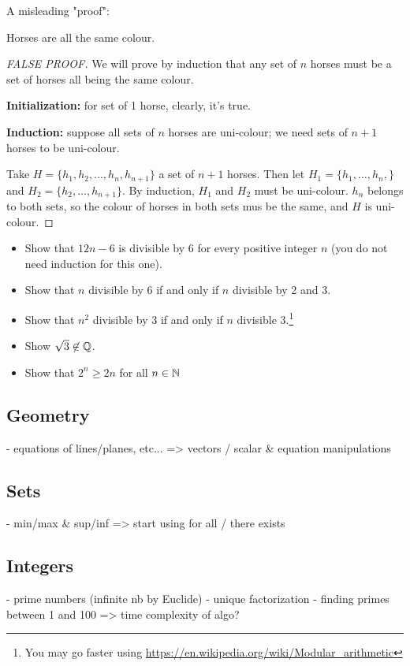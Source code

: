 A misleading "proof":
\begin{property}
    Horses are all the same colour.
\end{property}
\begin{proof}[FALSE PROOF]
    We will prove by induction that any set of $n$ horses must be a set of horses all being the same colour.
    
    \textbf{Initialization:} for set of 1 horse, clearly, it's true.
    
    \textbf{Induction:} suppose all sets of $n$ horses are uni-colour; we need sets of $n+1$ horses to be uni-colour.
    
    Take $H=\{ h_1, h_2, \dots, h_n, h_{n+1} \}$ a set of $n+1$ horses.
    Then let $H_1 = \{ h_1, \dots, h_n, \}$ and $H_2 = \{ h_2, \dots, h_{n+1} \}$.
    By induction, $H_1$ and $H_2$ must be uni-colour.
    $h_n$ belongs to both sets, so the colour of horses in both sets mus be the same, and $H$ is uni-colour.
\end{proof}

\begin{question}
    \begin{itemize}
        \item Show that $12n-6$ is divisible by 6 for every positive integer $n$ (you do not need induction for this one).
        \item Show that $n$ divisible by 6 if and only if $n$ divisible by 2 and 3.
        \item Show that $n^2$ divisible by 3 if and only if $n$ divisible 3.\footnote{You may go faster using \url{https://en.wikipedia.org/wiki/Modular_arithmetic}}
        \item Show $\sqrt{3} \not\in \mathbb{Q}$.
        \item Show that $2^n \geq 2n$ for all $n \in \mathbb{N}$
    \end{itemize}
\end{question}


\subsection{Geometry}
- equations of lines/planes, etc... => vectors / scalar \& equation manipulations
\subsection{Sets}
- min/max \& sup/inf => start using for all / there exists
\subsection{Integers}
- prime numbers (infinite nb by Euclide)
- unique factorization 
- finding primes between 1 and 100 => time complexity of algo?